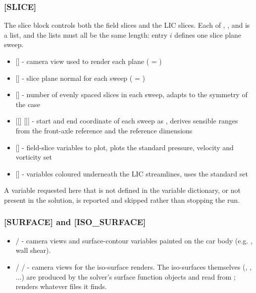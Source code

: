 \subsubsection{[SLICE]}
The slice block controls both the field slices and the LIC slices. Each of , ,  and  is a list, and the lists must all be the same length: entry $i$ defines one slice plane sweep.
\begin{itemize}
    \item {} [] - camera view used to render each plane ( = )

    \item {} [] - slice plane normal for each sweep ( = )

    \item {} [] - number of evenly spaced slices in each sweep,  adapts to the symmetry of the case

    \item {} [[] []] - start and end coordinate of each sweep as ,  derives sensible ranges from the front-axle reference and the reference dimensions

    \item {} [] - field-slice variables to plot,  plots the standard pressure, velocity and vorticity set

    \item {} [] - variables coloured underneath the LIC streamlines,  uses the standard set
\end{itemize}
A variable requested here that is not defined in the variable dictionary, or not present in the solution, is reported and skipped rather than stopping the run.

\subsubsection{[SURFACE] and [ISO\_SURFACE]}
\begin{itemize}
    \item \codeword{[SURFACE]}  /  - camera views and surface-contour variables painted on the car body (e.g. , wall shear).

    \item {}  /  /  - camera views for the iso-surface renders. The iso-surfaces themselves (, , ...) are produced by the solver's surface function objects and read from ;  renders whatever  files it finds.
\end{itemize}

